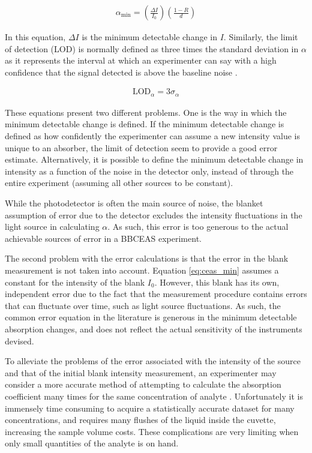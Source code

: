 \begin{align}
  \alpha_{\text{min}} = \left(\frac{\Delta
  I}{I_0}\right)\left(\frac{1-R}{d}\right)\label{eq:ceas_min}
\end{align}

In this equation, $\Delta I$ is the minimum detectable change in $I$.
Similarly, the limit of detection (LOD) is normally defined as three times
the standard deviation in $\alpha$ as it represents the interval at which an
experimenter can say with a high confidence that the signal detected is above
the baseline noise \cite{Islam:2007ea}.

\begin{align}
  \text{LOD}_{\alpha} = 3\sigma_{\alpha}\label{eq:lod}
\end{align}

These equations present two different problems. One is the way in which the
minimum detectable change is defined. If the minimum detectable change is
defined as how confidently the experimenter can assume a new intensity value
is unique to an absorber, the limit of detection seem to provide a good error
estimate. Alternatively, it is possible to define the minimum detectable
change in intensity as a function of the noise in the detector only, instead
of through the entire experiment (assuming all other sources to be constant).


While the photodetector is often the main source of noise, the blanket
assumption of error due to the detector excludes the intensity fluctuations in
the light source in calculating $\alpha$. As such, this error is too generous
to the actual achievable sources of error in a \ac{BBCEAS} experiment.

The second problem with the error calculations is that the error in the blank
measurement is not taken into account. Equation \eqref{eq:ceas_min} assumes
a constant for the intensity of the blank $I_0$. However, this blank has its
own, independent error due to the fact that the measurement procedure contains
errors that can fluctuate over time, such as light source fluctuations. As
such, the common error equation in the literature is generous in the minimum
detectable absorption changes, and does not reflect the actual sensitivity of
the instruments devised.

To alleviate the problems of the error associated with the intensity
of the source and that of the initial blank intensity measurement, an
experimenter may consider a more accurate method of attempting to calculate
the absorption coefficient many times for the same concentration of analyte
\cite{Islam:2007ea}. Unfortunately it is immensely time consuming to acquire
a statistically accurate dataset for many concentrations, and requires many
flushes of the liquid inside the cuvette, increasing the sample volume costs.
These complications are very limiting when only small quantities of the
analyte is on hand.

